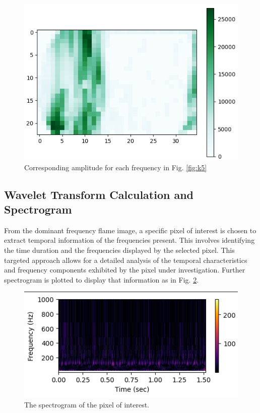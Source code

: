 \documentclass[conference]{IEEEtran}
\begin{document}
		\begin{figure}[H]
	\includegraphics[scale=.51]{plot/ampli.png}
	\caption{Corresponding amplitude for each frequency in Fig. \ref{fig:k5}}\label{fig:k6}
\end{figure}

\subsection{Wavelet Transform Calculation and Spectrogram}

From the dominant frequency flame image, a specific pixel of interest is chosen to extract temporal information of the frequencies present. This involves identifying the time duration and the frequencies displayed by the selected pixel. This targeted approach allows for a detailed analysis of the temporal characteristics and frequency components exhibited by the pixel under investigation. Further spectrogram is plotted to display that information as in Fig. \ref{fig:k7}.

		\begin{figure}[H]
	\includegraphics[scale=.51]{plot/spect.png}
	\caption{The spectrogram of the pixel of interest.}\label{fig:k7}
\end{figure}
\end{document}
